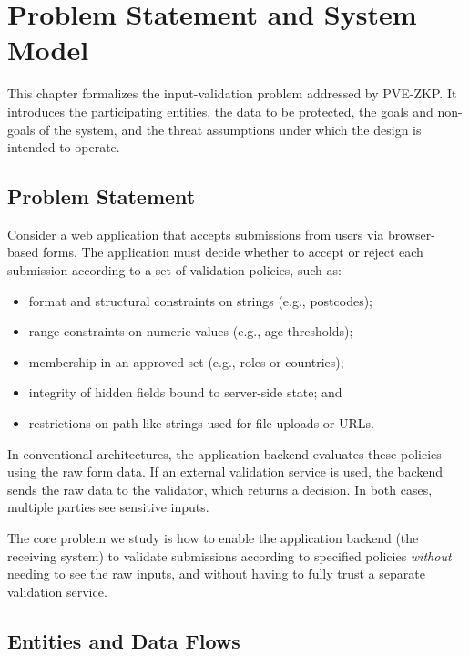 
\chapter{Problem Statement and System Model}

This chapter formalizes the input-validation problem addressed by PVE-ZKP. It
introduces the participating entities, the data to be protected, the goals and
non-goals of the system, and the threat assumptions under which the design is
intended to operate.

\section{Problem Statement}

Consider a web application that accepts submissions from users via
browser-based forms. The application must decide whether to accept or reject
each submission according to a set of validation policies, such as:

\begin{itemize}[leftmargin=*]
  \item format and structural constraints on strings (e.g., postcodes);
  \item range constraints on numeric values (e.g., age thresholds);
  \item membership in an approved set (e.g., roles or countries);
  \item integrity of hidden fields bound to server-side state; and
  \item restrictions on path-like strings used for file uploads or URLs.
\end{itemize}

In conventional architectures, the application backend evaluates these policies
using the raw form data. If an external validation service is used, the backend
sends the raw data to the validator, which returns a decision. In both cases,
multiple parties see sensitive inputs.

The core problem we study is how to enable the application backend (the
receiving system) to validate submissions according to specified policies
\emph{without} needing to see the raw inputs, and without having to fully trust
a separate validation service.

\section{Entities and Data Flows}

